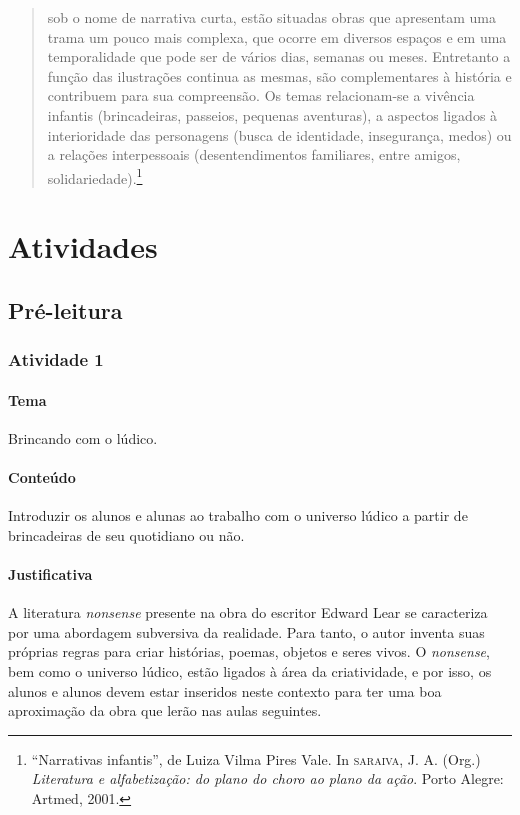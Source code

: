 \documentclass[11pt]{extarticle}
\begin{document}
\begin{quote}
sob o nome de narrativa curta, estão situadas obras que apresentam uma trama 
um pouco mais complexa, que ocorre em diversos espaços e em uma temporalidade 
que pode ser de vários dias, semanas ou meses. Entretanto a função das ilustrações 
continua as mesmas, são complementares à história e contribuem para sua compreensão. 
Os temas relacionam-se a vivência infantis (brincadeiras, passeios, pequenas aventuras), 
a aspectos ligados à interioridade das personagens (busca de identidade, insegurança, 
medos) ou a relações interpessoais (desentendimentos familiares, entre amigos, solidariedade).\footnote{“Narrativas infantis”, de Luiza Vilma Pires Vale. In \textsc{saraiva}, J. A. (Org.) \textit{Literatura e alfabetização: do plano do choro ao plano da ação}. Porto Alegre: Artmed, 2001.} 
\end{quote}

\section{Atividades}

\subsection{Pré-leitura}

\subsubsection{Atividade 1}


\paragraph{Tema} Brincando com o lúdico.

\paragraph{Conteúdo} Introduzir os alunos e alunas ao trabalho com o 
universo lúdico a partir de brincadeiras de seu quotidiano ou não.

\paragraph{Justificativa} A literatura \emph{nonsense} presente na obra 
do escritor Edward Lear se caracteriza por uma abordagem subversiva da realidade. 
Para tanto, o autor inventa suas próprias regras para criar histórias,
poemas, objetos e seres vivos. O \emph{nonsense}, bem como o universo lúdico,
estão ligados à área da criatividade, e por isso, os alunos e alunos
devem estar inseridos neste contexto para ter uma boa aproximação da
obra que lerão nas aulas seguintes.  
\end{document}
